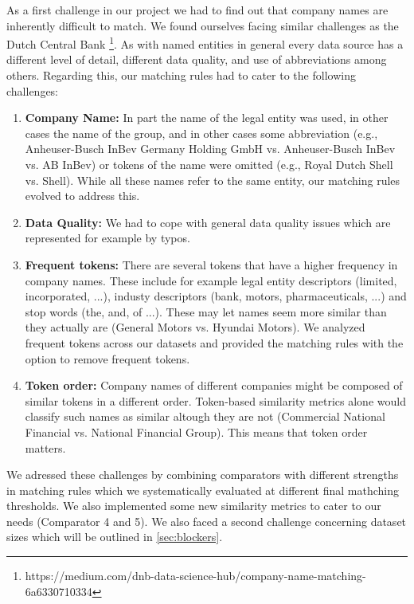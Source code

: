 \documentclass[11pt,titlepage,oneside,openany]{book}
\begin{document}
As a first challenge in our project we had to find out that company names are inherently difficult to match. We found ourselves facing similar challenges as the Dutch Central Bank \footnote{https://medium.com/dnb-data-science-hub/company-name-matching-6a6330710334}. %
As with named entities in general every data source has a different level of detail, different data quality, and use of abbreviations among others. Regarding this, our matching rules had to cater to the following challenges:
\begin{enumerate}
	\item \textbf{Company Name:} In part the name of the legal entity was used, in other cases the name of the group, and in other cases some abbreviation (e.g., Anheuser-Busch InBev Germany Holding GmbH vs. Anheuser-Busch InBev vs. AB InBev) or tokens of the name were omitted (e.g., Royal Dutch Shell vs. Shell). While all these names refer to the same entity, our matching rules evolved to address this.
	\item \textbf{Data Quality:} We had to cope with general data quality issues which are represented for example by typos.
	\item \textbf{Frequent tokens:} There are several tokens that have a higher frequency in company names. These include for example legal entity descriptors (limited, incorporated, ...), industy descriptors (bank, motors, pharmaceuticals, ...) and stop words (the, and, of ...). These may let names seem more similar than they actually are (General Motors vs. Hyundai Motors). We analyzed frequent tokens across our datasets and provided the matching rules with the option to remove frequent tokens.
	\item \textbf{Token order:} Company names of different companies might be composed of similar tokens in a different order. Token-based similarity metrics alone would classify such names as similar altough they are not (Commercial National Financial vs. National Financial Group). This means that token order matters.
\end{enumerate}

We adressed these challenges by combining comparators with different strengths in matching rules which we systematically evaluated at different final mathching thresholds. We also implemented some new similarity metrics to cater to our needs (Comparator 4 and 5).
We also faced a second challenge concerning dataset sizes which will be outlined in \ref{sec:blockers}.
\end{document}
